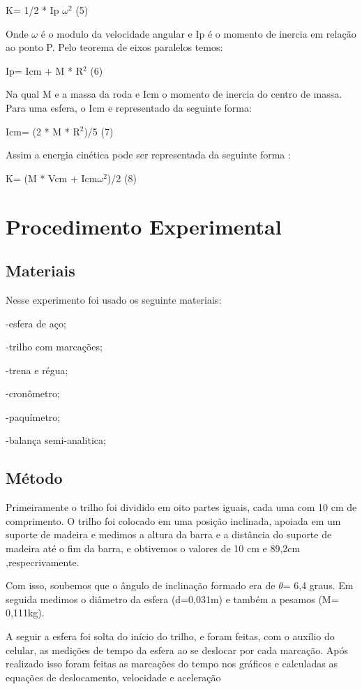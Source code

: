 \documentclass[
	12pt,				%
	oneside,			%
	a4paper,			%
	english,			%
	french,				%
	spanish,			%
	brazil,				%
	]{abntex2}
\begin{document}
K= 1/2 * Ip $\omega^{2}$  (5)

Onde $\omega$ é o modulo da velocidade angular e Ip é o momento de inercia em relação ao ponto P. Pelo teorema de eixos paralelos temos:

Ip= Icm + M * R$^{2}$  (6)

Na qual M e a massa da roda e Icm o momento de inercia  do centro de massa.
Para uma esfera, o Icm e representado da seguinte forma:

Icm= (2 * M * R$^{2}$)/5  (7)

Assim a energia cinética  pode ser representada da seguinte forma :

K= (M * Vcm + Icm$\omega^{2}$)/2 (8)

\newpage
\section[Procedimento Experimental]{Procedimento Experimental}
\pagestyle{fancy}
\subsection[Materiais]{Materiais}
Nesse experimento foi usado os seguinte materiais:

-esfera de aço;

-trilho com marcações;

-trena e régua;

-cronômetro;

-paquímetro;

-balança semi-analitica;

\subsection[Método]{Método} 
Primeiramente o trilho foi dividido em oito partes iguais, cada uma com 10 cm de comprimento. O trilho foi colocado em uma posição inclinada, apoiada em um suporte de madeira e medimos a altura da barra e a distância do suporte de madeira até o fim da barra, e obtivemos o valores de 10 cm e 89,2cm ,respecrivamente. 

Com isso, soubemos que o ângulo de inclinação formado era de $\theta$= 6,4 graus. Em seguida medimos o diâmetro da esfera (d=0,031m) e também a pesamos (M= 0,111kg).

A seguir a esfera foi solta do início  do trilho, e foram feitas, com o auxílio do celular, as medições de tempo da esfera ao se deslocar por cada marcação. Após realizado isso foram feitas as marcações do tempo nos gráficos e calculadas as equações de deslocamento, velocidade e aceleração
\end{document}
